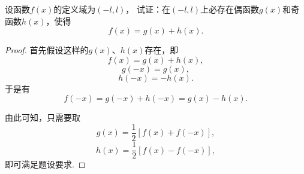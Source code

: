 \begin{example}
设函数\(f(x)\)的定义域为\((-l,l)\)，
试证：在\((-l,l)\)上必存在偶函数\(g(x)\)和奇函数\(h(x)\)，使得\[
	f(x) = g(x)+h(x).
\]
\begin{proof}
首先假设这样的\(g(x)\)、\(h(x)\)存在，即\[
	f(x) = g(x) + h(x),
\]\[
	g(-x) = g(x),
\]\[
	h(-x) = -h(x).
\]
于是有\[
	f(-x) = g(-x) + h(-x) = g(x) - h(x).
\]

由此可知，只需要取\[
	g(x) = \frac{1}{2} [f(x) + f(-x)],
\]\[
	h(x) = \frac{1}{2} [f(x) - f(-x)],
\]
即可满足题设要求.
\end{proof}
\end{example}
